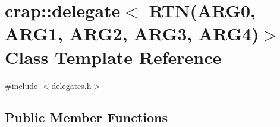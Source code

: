 \hypertarget{classcrap_1_1delegate_3_01_r_t_n_07_a_r_g0_00_01_a_r_g1_00_01_a_r_g2_00_01_a_r_g3_00_01_a_r_g4_08_4}{}\section{crap\+:\+:delegate$<$ R\+T\+N(A\+R\+G0, A\+R\+G1, A\+R\+G2, A\+R\+G3, A\+R\+G4)$>$ Class Template Reference}
\label{classcrap_1_1delegate_3_01_r_t_n_07_a_r_g0_00_01_a_r_g1_00_01_a_r_g2_00_01_a_r_g3_00_01_a_r_g4_08_4}


{\ttfamily \#include $<$delegates.\+h$>$}

\subsection*{Public Member Functions}
